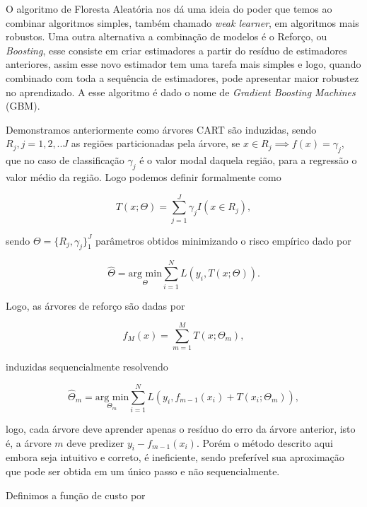 O algoritmo de Floresta Aleatória nos dá uma ideia do poder que temos ao
combinar algoritmos simples, também chamado \textit{weak learner}, em
algoritmos mais robustos. Uma outra alternativa a combinação de modelos é o
Reforço, ou \textit{Boosting}, esse consiste em criar estimadores a partir do
resíduo de estimadores anteriores, assim esse novo estimador tem uma tarefa
mais simples e logo, quando combinado com toda a sequência de estimadores, pode
apresentar maior robustez no aprendizado. A esse algoritmo é dado o nome de \textit{Gradient Boosting Machines} (GBM).

Demonstramos anteriormente como árvores CART são induzidas, sendo $R_j,j=1,2,..J$ as regiões particionadas pela árvore, se $x \in R_j \implies f(x) = \gamma_j$, que no caso de classificação $\gamma_j$ é o valor modal daquela região, para a regressão o valor médio da região. Logo podemos definir formalmente como

\begin{equation}
    T(x;\Theta) = \sum_{j=1}^J \gamma_j I(x \in R_j),
\end{equation}

sendo $\Theta = \{R_j,\gamma_j\}_1^J$ parâmetros obtidos minimizando o risco empírico dado por

\begin{equation}
    \hat{\Theta} = \underset{\Theta}{\text{arg min}}
    \sum_{i=1}^N L(y_i,T(x;\Theta)).
\end{equation}

Logo, as árvores de reforço são dadas por

\begin{equation}
\label{eq:tree_boost}
    f_M(x) = \sum_{m=1}^M T(x;\Theta_m),
\end{equation}

induzidas sequencialmente resolvendo

\begin{equation}
    \hat{\Theta}_m = \underset{\Theta_m}{\text{arg min}}
    \sum_{i=1}^N L(y_i,f_{m-1}(x_i)+T(x_i;\Theta_m)),
\end{equation}

logo, cada árvore deve aprender apenas o resíduo do erro da árvore anterior, isto é, a árvore $m$ deve predizer $y_i - f_{m-1}(x_i)$. Porém o método descrito aqui embora seja intuitivo e correto, é ineficiente, sendo preferível sua aproximação que pode ser obtida em um único passo e não sequencialmente.

Definimos a função de custo por

